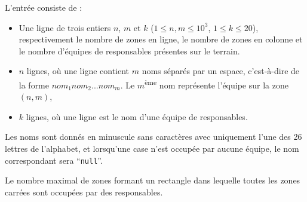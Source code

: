 \begin{Input}
	L'entrée consiste de :
	\begin{itemize}
		\item Une ligne de trois entiers $n$, $m$ et $k$ ($1 \le n,m \le 10^3$, $1 \le k \le 20$),
respectivement le nombre de zones en ligne, le nombre de zones en colonne et le nombre d'équipes de responsables présentes sur le terrain.
		\item $n$ lignes, où une ligne contient $m$ noms séparés par un espace, c'est-à-dire de la forme $nom_1 nom_2 ... nom_m$. Le $m$\textsuperscript{ème} nom représente l'équipe sur la zone $(n,m)$,
		\item $k$ lignes, où une ligne est le nom d'une équipe de responsables.
	\end{itemize}
	Les noms sont donnés en minuscule sans caractères avec uniquement l'une des 26 lettres de l'alphabet, et lorsqu'une case n'est occupée par aucune équipe, le nom correspondant sera ``\verb|null|''.
\end{Input}

\begin{Output}
	Le nombre maximal de zones formant un rectangle dans lequelle toutes les zones carrées sont occupées par des responsables.
\end{Output}
